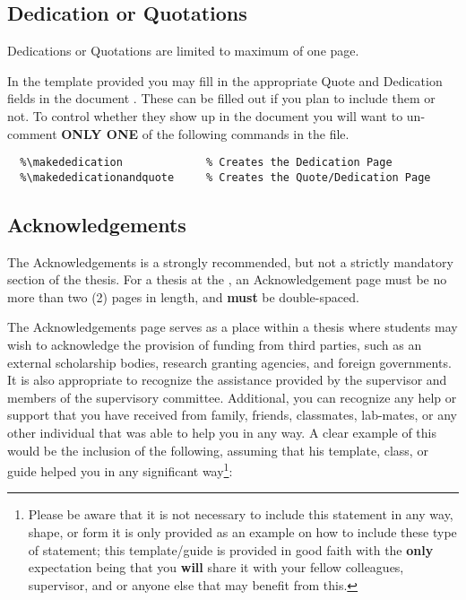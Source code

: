 		\subsection{Dedication or Quotations}\label{quote}\label{dedication}
			Dedications or Quotations are limited to maximum of one page.
			
			In the template provided you may fill in the appropriate Quote and Dedication fields in the document .
			These can be filled out if you plan to include them or not.
			To control whether they show up in the document you will want to un-comment \textbf{ONLY ONE} of the following commands in the  file.

			\begin{lstlisting}[float=ht,caption=Quote and Dedication Inclusion Options (un-comment only one),label=lst:QuotesAndDedication,style=LaTeXStyle,basicstyle=\scriptsize\ttfamily,]
  %\makequote                  % Creates the Quote Page
  %\makededication             % Creates the Dedication Page
  %\makededicationandquote     % Creates the Quote/Dedication Page
			\end{lstlisting}

		\subsection{Acknowledgements}\label{acknowledgement}
			The Acknowledgements is a strongly recommended, but not a strictly mandatory section of the thesis.
			For a thesis at the \University, an Acknowledgement page must be no more than two (2) pages in length, and \textbf{must} be double-spaced.
	
			The Acknowledgements page serves as a place within a thesis where students may wish to acknowledge the provision of funding from third parties, such as an external scholarship bodies, research granting agencies, and foreign governments. 
			It is also appropriate to recognize the assistance provided by the supervisor and members of the supervisory committee.
			Additional, you can recognize any help or support that you have received from family, friends, classmates, lab-mates, or any other individual that was able to help you in any way.
			A clear example of this would be the inclusion of the following, assuming that his template, class, or guide helped you in any significant way\footnote{Please be aware that it is not necessary to include this statement in any way, shape, or form it is only provided as an example on how to include these type of statement; this template/guide is provided in good faith with the \textbf{only} expectation being that you \textbf{will} share it with your fellow colleagues, supervisor, and or anyone else that may benefit from this.}:
			
